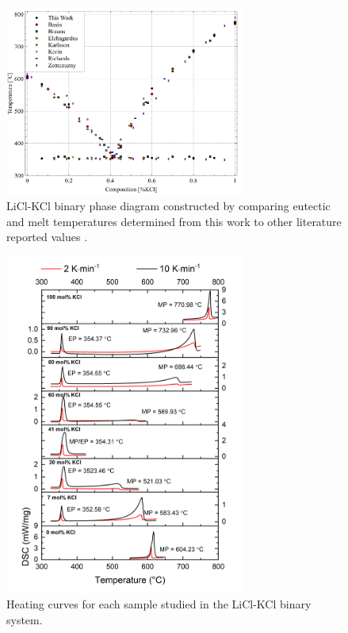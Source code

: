 \documentclass[review]{elsarticle}
\begin{document}
\begin{figure}[h]
 \centering
 \includegraphics[width=0.7\textwidth]{images/DSC analysis.jpg} 
 \caption{LiCl-KCl binary phase diagram constructed by comparing eutectic and melt temperatures determined from this work to other literature reported values \cite{RN79,RN78,RN77,RN76,RN75,RN16}.}
 \label{fig:figureDSC}
\end{figure}

 

\begin{figure}[]
 \centering
 \includegraphics[width=0.7\textwidth]{images/DSCheatcurves.jpg} 
 \caption{Heating curves for each sample studied in the LiCl-KCl binary system. }
 \label{fig:figureDSC2}
\end{figure}
\end{document}
